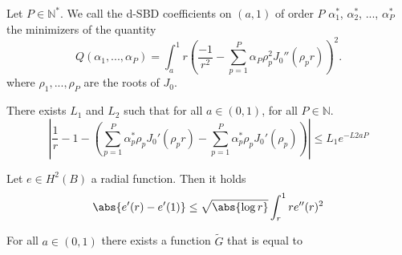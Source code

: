 \documentclass[]{article}
\begin{document}
\begin{Def}
	Let $P \in \mathbb{N}^*$. We call the d-SBD coefficients on $(a,1)$ of order $P$ $\alpha_1^*$, $\alpha_2^*$, ..., $\alpha_P^*$ the minimizers of the quantity
	\[Q(\alpha_1,...,\alpha_P) = \int_{a}^{1} r \left(\frac{-1}{r^2} - \sum_{p=1}^{P} \alpha_P \rho_p^2 J_0''(\rho_p r)\right)^2. \]
	where $\rho_1, ..., \rho_P$ are the roots of $J_0$.   
\end{Def}

\begin{The}
	There exists $L_1$ and $L_2$ such that for all $a \in (0,1)$, for all $P \in \mathbb{N}$. 
	\[ \left|\dfrac{1}{r} - 1 - \left(\sum_{p=1}^P\alpha_p^*\rho_p J_0'(\rho_p r) - \sum_{p=1}^P \alpha_p^* \rho_p J_0'(\rho_p)\right) \right| \leq L_1 e^{-L2 aP}\]
\end{The}

\begin{Lem}
	Let $e \in H^2(B)$ a radial function. Then it holds 
	\[ \abs{e'(r) - e'(1)} \leq \sqrt{\abs{\log r}} \int_{r}^1 r e''(r)^2\]  
\end{Lem}

\begin{Lem}
	For all $a \in (0,1)$ there exists a function $\tilde{G}$ that is equal to 
\end{Lem}
\end{document}

